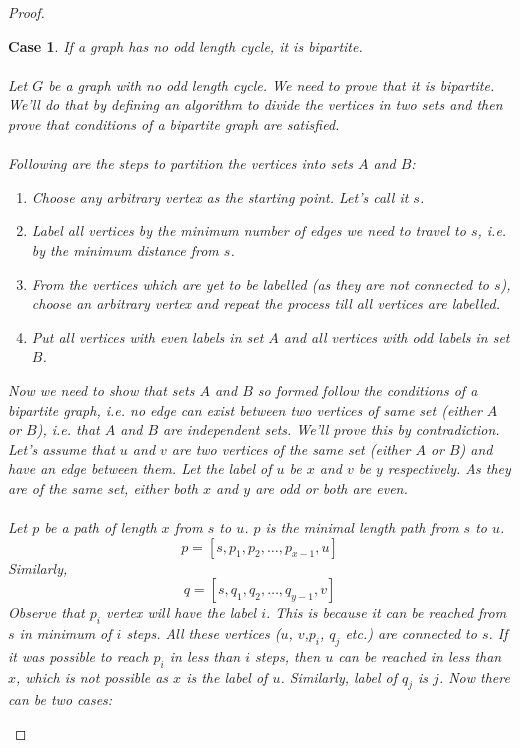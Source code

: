 \documentclass{article}
\newtheorem{case}{Case}
\begin{document}
\begin{proof}
    \begin{case}
        If a graph has no odd length cycle, it is bipartite.\\
        \\
        Let $G$ be a graph with no odd length cycle. We need to prove that it is bipartite. We'll do that by defining an algorithm to divide the vertices in two sets and then prove that conditions of a bipartite graph are satisfied.\\
        \\Following are the steps to partition the vertices into sets $A$ and $B$:
        \begin{enumerate}
            \item Choose any arbitrary vertex as the starting point. Let's call it $s$.
            \item Label all vertices by the minimum number of edges we need to travel to $s$, i.e. by the minimum distance from $s$.
            \item From the vertices which are yet to be labelled (as they are not connected to $s$), choose an arbitrary vertex and repeat the process till all vertices are labelled.
            \item Put all vertices with even labels in set $A$ and all vertices with odd labels in set $B$.
        \end{enumerate}
        Now we need to show that sets $A$ and $B$ so formed follow the conditions of a bipartite graph, i.e. no edge can exist between two vertices of same set (either $A$ or $B$), i.e. that $A$ and $B$ are independent sets. We'll prove this by contradiction. Let's assume that $u$ and $v$ are two vertices of the same set (either $A$ or $B$) and have an edge between them. Let the label of $u$ be $x$ and $v$ be $y$ respectively. As they are of the same set, either both $x$ and $y$ are odd or both are even.\\
        \\
        Let $p$ be a path of length $x$ from $s$ to $u$. $p$ is the minimal length path from $s$ to $u$.\\
        \begin{equation*}
            p = [s,p_{1},p_{2},\dots,p_{x-1},u]
        \end{equation*}
        \phantom{xxxxxxxxxxxxxxxxxxxxxxxxx}Similarly,
        \begin{equation*}
            q = [s,q_{1},q_{2},\dots,q_{y-1},v]
        \end{equation*}
        Observe that $p_{i}$ vertex will have the label $i$. This is because it can be reached from $s$ in minimum of $i$ steps. All these vertices ($u$, $v$,$p_{i}$, $q_{j}$ etc.) are connected to $s$. If it was possible to reach $p_{i}$ in less than $i$ steps, then $u$ can be reached in less than $x$, which is not possible as $x$ is the label of $u$. Similarly, label of $q_{j}$ is $j$. Now there can be two cases:\\

\end{case}
\end{proof}
\end{document}
